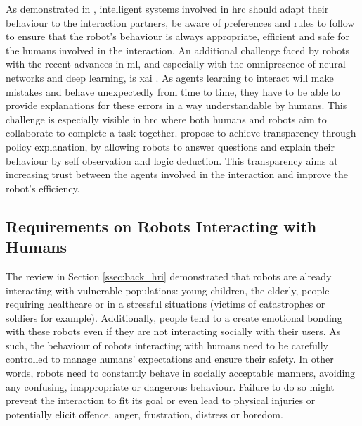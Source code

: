 	As demonstrated in \cite{munzer2017efficient}, intelligent systems involved in \gls{hrc} should adapt their behaviour to the interaction partners, be aware of preferences and rules to follow to ensure that the robot's behaviour is always appropriate, efficient and safe for the humans involved in the interaction. An additional challenge faced by robots with the recent advances in \gls{ml}, and especially with the omnipresence of neural networks and deep learning, is \gls{xai} \citep{wachter2017transparent}. As agents learning to interact will make mistakes and behave unexpectedly from time to time, they have to be able to provide explanations for these errors in a way understandable by humans. This challenge is especially visible in \gls{hrc} where both humans and robots aim to collaborate to complete a task together. \cite{hayes2017improving} propose to achieve transparency through policy explanation, by allowing robots to answer questions and explain their behaviour by self observation and logic deduction. This transparency aims at increasing trust between the agents involved in the interaction and improve the robot's efficiency.

\subsection{Requirements on Robots Interacting with Humans} \label{ssec:back_constraints}

    The review in Section \ref{ssec:back_hri} demonstrated that robots are already interacting with vulnerable populations: young children, the elderly, people requiring healthcare or in a stressful situations (victims of catastrophes or soldiers for example). Additionally, people tend to a create emotional bonding with these robots even if they are not interacting socially with their users. As such, the behaviour of robots interacting with humans need to be carefully controlled to manage humans' expectations and ensure their safety. In other words, robots need to constantly behave in socially acceptable manners, avoiding any confusing, inappropriate or dangerous behaviour. Failure to do so might prevent the interaction to fit its goal or even lead to physical injuries or potentially elicit offence, anger, frustration, distress or boredom. 
    
